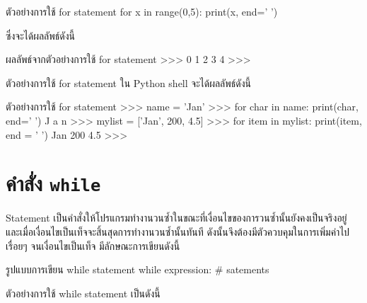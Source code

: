 \begin{codelist}{ตัวอย่างการใช้ for statement}{}
for x in range(0,5): print(x, end=' ')
\end{codelist}

ซึ่งจะได้ผลลัพธ์ดังนี้


\begin{codelist}{ผลลัพธ์จากตัวอย่างการใช้ for statement}{}
>>>
0 1 2 3 4
>>>
\end{codelist}

ตัวอย่างการใช้ for statement ใน Python shell จะได้ผลลัพธ์ดังนี้


\begin{codelist}{ตัวอย่างการใช้ for statement}{}
>>> name = 'Jan'
>>> for char in name: print(char, end=' ')
J a n 
>>> mylist = ['Jan', 200, 4.5]
>>> for item in mylist: print(item, end = ' ')
Jan 200 4.5 
>>> 
\end{codelist}




\section{คำสั่ง \texttt{while}}

  Statement เป็นคำสั่งให้โปรแกรมทำงานวนซ้ำในขณะที่เงื่อนไขของการวนซ้ำนั้นยังคงเป็นจริงอยู่ และเมื่อเงื่อนไขเป็นเท็จจะสิ้นสุดการทำงานวนซ้ำนั้นทันที ดังนั้นจึงต้องมีตัวควบคุมในการเพิ่มค่าไปเรื่อยๆ จนเงื่อนไขเป็นเท็จ มีลักษณะการเขียนดังนี้


\begin{codelist}{รูปแบบการเขียน while statement}{}
while expression:
    # satements
\end{codelist}

ตัวอย่างการใช้ while statement เป็นดังนี้


